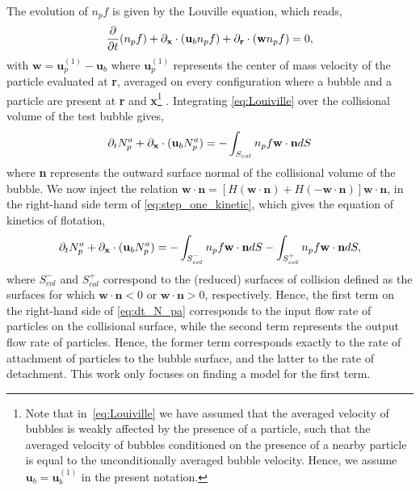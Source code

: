 The evolution of $ n_p f$ is given by the Louville equation, which reads, 
\begin{equation}
    \frac{\partial}{\partial t}(n_p f)
    +\pddx\cdot (\textbf{u}_b n_p f)
    +\pddr\cdot(\textbf{w} n_p f)
    =0, 
    \label{eq:Louiville}
\end{equation}
with $\textbf{w} = \textbf{u}_p^{(1)} - \textbf{u}_b$ where $\textbf{u}_p^{(1)}$ represents the center of mass velocity of the particle evaluated at \textbf{r}, averaged on every configuration where a bubble and a particle are present at \textbf{r} and \textbf{x}\footnote{Note that in~\eqref{eq:Louiville} we have assumed that the averaged velocity of bubbles is weakly affected by the presence of a particle, such that the averaged velocity of bubbles conditioned on the presence of a nearby particle is equal to the unconditionally averaged bubble velocity. Hence, we assume $\textbf{u}_b = \textbf{u}_b^{(1)}$ in the present notation.} .
Integrating \eqref{eq:Louiville} over the collisional volume of the test bubble gives,
\begin{equation}
    \pddt N_p^a
    +\pddx\cdot (\textbf{u}_b N_p^a )
    =
    - \int_{S_{col}} n_p f \textbf{w}\cdot \textbf{n} dS
    \label{eq:step_one_kinetic}
\end{equation}
where \textbf{n} represents the outward surface normal of the collisional volume of the bubble.
We now inject the relation $\textbf{w}\cdot \textbf{n} = [H(\textbf{w}\cdot \textbf{n})+H(-\textbf{w}\cdot \textbf{n})] \textbf{w}\cdot \textbf{n}$, in the right-hand side term of \eqref{eq:step_one_kinetic}, which gives the equation of kinetics of flotation, 
\begin{equation}
    \pddt N_p^a
    +\pddx\cdot (\textbf{u}_b N_p^a )
    =
    - \int_{S_{col}^-} n_p f \textbf{w}\cdot \textbf{n} dS
    - \int_{S_{col}^+} n_p f \textbf{w}\cdot \textbf{n} dS,
    \label{eq:dt_N_pa}
\end{equation}
where $S_{col}^-$ and $S_{col}^+$ correspond to the (reduced) surfaces of collision defined as the surfaces for which  $\textbf{w}\cdot \textbf{n}<0$ or $\textbf{w}\cdot \textbf{n} >0$, respectively.  
Hence, the first term on the right-hand side of \eqref{eq:dt_N_pa} corresponds to the input flow rate of particles on the collisional surface, while the second term represents the output flow rate of particles. 
Hence, the former term corresponds exactly to the rate of attachment of particles to the bubble surface, and the latter to the rate of detachment. 
This work only focuses on finding a model for the first term. 


